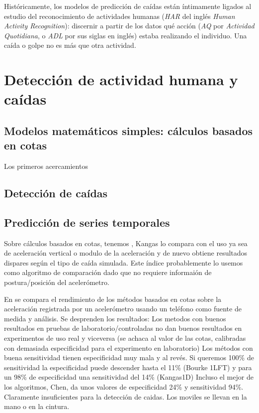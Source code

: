 \documentclass[../tfm.tex]{subfiles}
\begin{document}
Históricamente, los modelos de predicción de caídas están íntimamente ligados al estudio del reconocimiento de actividades humanas (\textit{HAR} del inglés \textit{Human Activity Recognition}): discernir a partir de los datos qué acción (\textit{AQ} por \textit{Actividad Quotidiana}, o \textit{ADL} por sus siglas en inglés) estaba realizando el individuo. Una caída o golpe no es más que otra actividad.

\section{Detección de actividad humana y caídas}

\subsection{Modelos matemáticos simples: cálculos basados en cotas}

Los primeros acercamientos

\subsection{Detección de caídas}

\subsection{Predicción de series temporales}

Sobre cálculos basados en cotas, tenemos \cite{fallIndex00}, Kangas\cite{Kangas2008} lo compara con el uso ya sea de aceleración vertical o modulo de la aceleración y de nuevo obtiene resultados dispares según el tipo de caída simulada. Este índice probablemente lo usemos como algoritmo de comparación dado que no requiere informaión de postura/posición del acelerómetro.

En \cite{Bagala2012} se compara el rendimiento de los métodos basados en cotas sobre la aceleración registrada por un acelerómetro usando un teléfono como fuente de medida y análisis. Se desprenden los resultados:
Los metodos con buenos resultados en pruebas de laboratorio/controladas no dan buenos resultados en experimentos de uso real y viceversa (se achaca al valor de las cotas, calibradas con demasiada especificidad para el experimento en laboratorio)
Los métodos con buena sensitividad tienen especificidad muy mala y al revés. Si queremos 100\% de sensitividad la especificidad puede descender hasta el 11\% (Bourke 1LFT) y para un 98\% de especificidad una sensitividad del 14\% (Kangas1D)
Incluso el mejor de los algoritmos, Chen, da unos valores de especificidad 24\% y sensitividad 94\%. Claramente insuficientes para la detección de caidas.
Los moviles se llevan en la mano o en la cintura.
\end{document}
